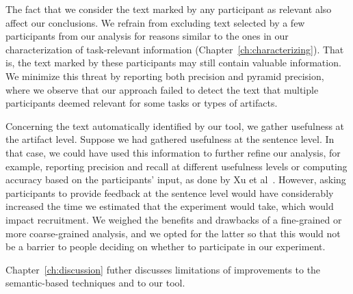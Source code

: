 The fact that we consider the text marked by any participant as relevant 
also affect our conclusions. 
We refrain from excluding text selected by a few participants from our analysis 
for reasons similar to the ones in our characterization of task-relevant information (Chapter~\ref{ch:characterizing}). That is, the text marked by these participants may still contain valuable information. 
We minimize this threat by reporting both precision and pyramid precision, where we observe that 
our approach failed to detect the text that multiple participants deemed relevant
for some tasks or types of artifacts. 



Concerning the text automatically identified by our tool, we gather usefulness at the artifact level.
Suppose we had gathered usefulness at the sentence level. In that case, we could have used this information 
to further refine our analysis, for example, reporting precision and recall 
at different usefulness levels or computing accuracy based on the participants' input, as done by Xu et al~\cite{Xu2017}. 
However, asking participants to provide feedback at the sentence level would have considerably increased the time we estimated that the experiment would take,
which would impact recruitment. We weighed the benefits and drawbacks of a fine-grained or more coarse-grained 
analysis, and we opted for the latter so that this would not be a barrier to people deciding on 
whether to participate in our experiment.


Chapter~\ref{ch:discussion} futher discusses limitations of improvements to the semantic-based techniques and to our tool.